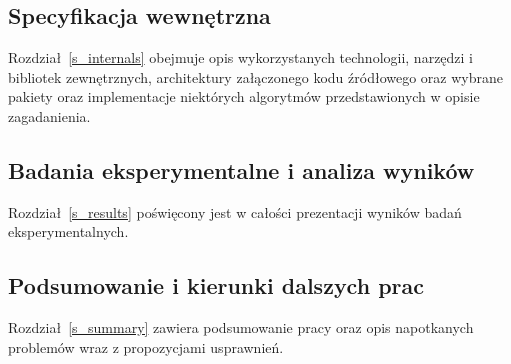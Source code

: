 \subsection{Specyfikacja wewnętrzna}
\par{
  Rozdział~\ref{s_internals} obejmuje opis wykorzystanych technologii, narzędzi i bibliotek zewnętrznych, architektury załączonego kodu źródłowego oraz wybrane pakiety oraz implementacje niektórych algorytmów przedstawionych w opisie zagadanienia.
}
\subsection{Badania eksperymentalne i analiza wyników}
\par{
  Rozdział~\ref{s_results} poświęcony jest w całości prezentacji wyników badań eksperymentalnych.
}
\subsection{Podsumowanie i kierunki dalszych prac}
\par{
  Rozdział~\ref{s_summary} zawiera podsumowanie pracy oraz opis napotkanych problemów wraz z propozycjami usprawnień.
}
